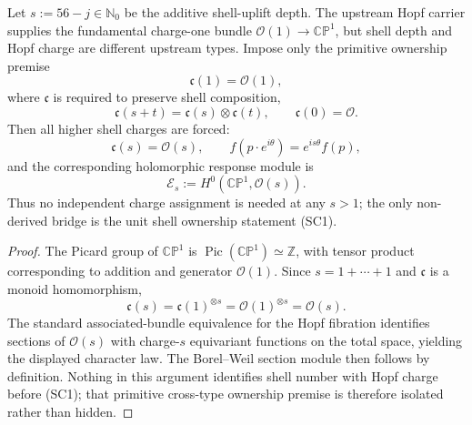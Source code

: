 \documentclass[12pt,a4paper]{article}
\begin{document}
\begin{theorem}
\label{p8:thm:shell-uplift-hopf-charge}
Let $s:=56-j\in\mathbb N_0$ be the additive shell-uplift depth.  The upstream Hopf carrier supplies the fundamental charge-one bundle $\mathcal O(1)\to\mathbb{CP}^1$, but shell depth and Hopf charge are different upstream types.  Impose only the primitive ownership premise
\begin{equation}
\label{p8:eq:SC1-shell-charge-owner}
\tag{SC1}
\mathfrak c(1)=\mathcal O(1),
\end{equation}
where $\mathfrak c$ is required to preserve shell composition,
\begin{equation}
\mathfrak c(s+t)=\mathfrak c(s)\otimes\mathfrak c(t),
\qquad \mathfrak c(0)=\mathcal O.
\end{equation}
Then all higher shell charges are forced:
\begin{equation}
\label{p8:eq:hopf-equivariant-charge-s}
\mathfrak c(s)=\mathcal O(s),
\qquad
f(p\cdot e^{i\theta})=e^{is\theta}f(p),
\end{equation}
and the corresponding holomorphic response module is
\begin{equation}
\label{p8:eq:Es-Hopfbundle-module}
\mathcal E_s:=H^0(\mathbb{CP}^1,\mathcal O(s)).
\end{equation}
Thus no independent charge assignment is needed at any $s>1$; the only non-derived bridge is the unit shell ownership statement (SC1).
\end{theorem}

\begin{proof}
The Picard group of $\mathbb{CP}^1$ is $\operatorname{Pic}(\mathbb{CP}^1)\simeq\mathbb Z$, with tensor product corresponding to addition and generator $\mathcal O(1)$.  Since $s=1+\cdots+1$ and $\mathfrak c$ is a monoid homomorphism,
\[
\mathfrak c(s)=\mathfrak c(1)^{\otimes s}=\mathcal O(1)^{\otimes s}=\mathcal O(s).
\]
The standard associated-bundle equivalence for the Hopf fibration identifies sections of $\mathcal O(s)$ with charge-$s$ equivariant functions on the total space, yielding the displayed character law.  The Borel--Weil section module then follows by definition.  Nothing in this argument identifies shell number with Hopf charge before (SC1); that primitive cross-type ownership premise is therefore isolated rather than hidden.
\end{proof}
\end{document}
